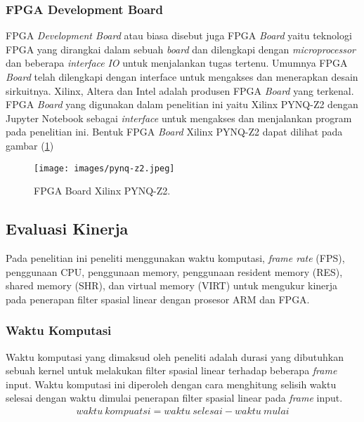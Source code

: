 \subsubsection{FPGA Development Board}
FPGA \textit{Development Board} atau biasa disebut juga FPGA \textit{Board} yaitu teknologi FPGA yang dirangkai dalam sebuah \textit{board} dan dilengkapi dengan \textit{microprocessor} dan beberapa \textit{interface} \textit{IO} untuk menjalankan tugas tertenu. Umumnya FPGA \textit{Board} telah dilengkapi dengan interface untuk mengakses dan menerapkan desain sirkuitnya. Xilinx, Altera dan Intel adalah produsen FPGA \textit{Board} yang terkenal. FPGA \textit{Board} yang digunakan dalam penelitian ini yaitu Xilinx PYNQ-Z2 dengan Jupyter Notebook sebagai \textit{interface} untuk mengakses dan menjalankan program pada penelitian ini. Bentuk FPGA \textit{Board} Xilinx PYNQ-Z2 dapat dilihat pada gambar (\ref{fig:pynq-z2})

\begin{figure}[ht]
    \texttt{[image: images/pynq-z2.jpeg]}
    \caption{FPGA Board Xilinx PYNQ-Z2.}
    \label{fig:pynq-z2}
\end{figure}


\subsection{Evaluasi Kinerja}
Pada penelitian ini peneliti menggunakan waktu komputasi, \textit{frame rate} (FPS), penggunaan CPU, penggunaan {memory}, penggunaan {resident memory} (RES), {shared memory} (SHR), dan {virtual memory} (VIRT) untuk mengukur kinerja pada penerapan filter spasial linear dengan prosesor ARM dan FPGA.

\subsubsection{Waktu Komputasi}
Waktu komputasi yang dimaksud oleh peneliti adalah durasi yang dibutuhkan sebuah kernel untuk melakukan filter spasial linear terhadap beberapa \textit{frame} input. Waktu komputasi ini diperoleh dengan cara menghitung selisih waktu selesai dengan waktu dimulai penerapan filter spasial linear pada \textit{frame} input.
\begin{equation}
    \label{eq:time}
    \begin{split}
waktu\ kompuatsi = waktu\ selesai - waktu\ mulai
    \end{split}
\end{equation}

